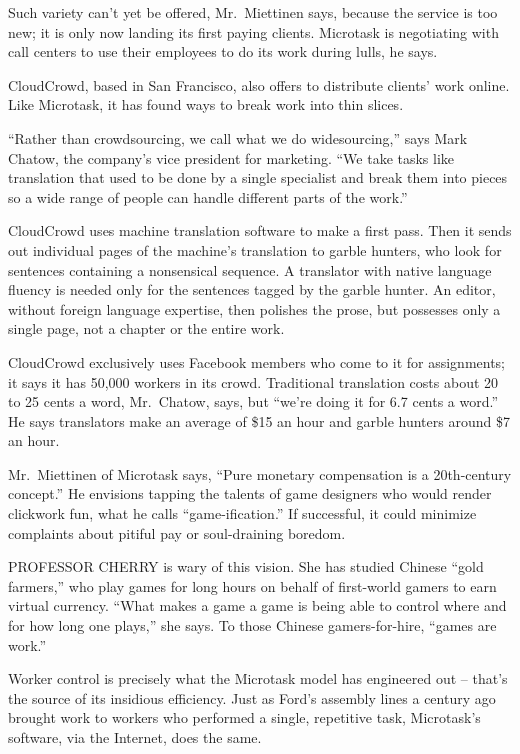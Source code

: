 ﻿\documentclass[12pt]{article}
\begin{document}
Such variety can't yet be offered, Mr.~Miettinen says, because the service is too new; it is only
now landing its first paying clients. Microtask is negotiating with call centers to use their
employees to do its work during lulls, he says.

CloudCrowd, based in San Francisco, also offers to distribute clients' work online. Like Microtask,
it has found ways to break work into thin slices.

``Rather than crowdsourcing, we call what we do widesourcing,'' says Mark Chatow, the company's vice
president for marketing. ``We take tasks like translation that used to be done by a single
specialist and break them into pieces so a wide range of people can handle different parts of the
work.''

CloudCrowd uses machine translation software to make a first pass. Then it sends out individual
pages of the machine's translation to garble hunters, who look for sentences containing a
nonsensical sequence. A translator with native language fluency is needed only for the sentences
tagged by the garble hunter. An editor, without foreign language expertise, then polishes the prose,
but possesses only a single page, not a chapter or the entire work.

CloudCrowd exclusively uses Facebook members who come to it for assignments; it says it has 50,000
workers in its crowd. Traditional translation costs about 20 to 25 cents a word, Mr.~Chatow, says,
but ``we're doing it for 6.7 cents a word.'' He says translators make an average of \$15 an hour and
garble hunters around \$7 an hour.

Mr.~Miettinen of Microtask says, ``Pure monetary compensation is a 20th-century concept.'' He
envisions tapping the talents of game designers who would render clickwork fun, what he calls
``game-ification.'' If successful, it could minimize complaints about pitiful pay or soul-draining
boredom.

PROFESSOR CHERRY is wary of this vision. She has studied Chinese ``gold farmers,'' who play games
for long hours on behalf of first-world gamers to earn virtual currency. ``What makes a game a game
is being able to control where and for how long one plays,'' she says. To those Chinese
gamers-for-hire, ``games are work.''

Worker control is precisely what the Microtask model has engineered out -- that's the source of its
insidious efficiency. Just as Ford's assembly lines a century ago brought work to workers who
performed a single, repetitive task, Microtask's software, via the Internet, does the same.
\end{document}
